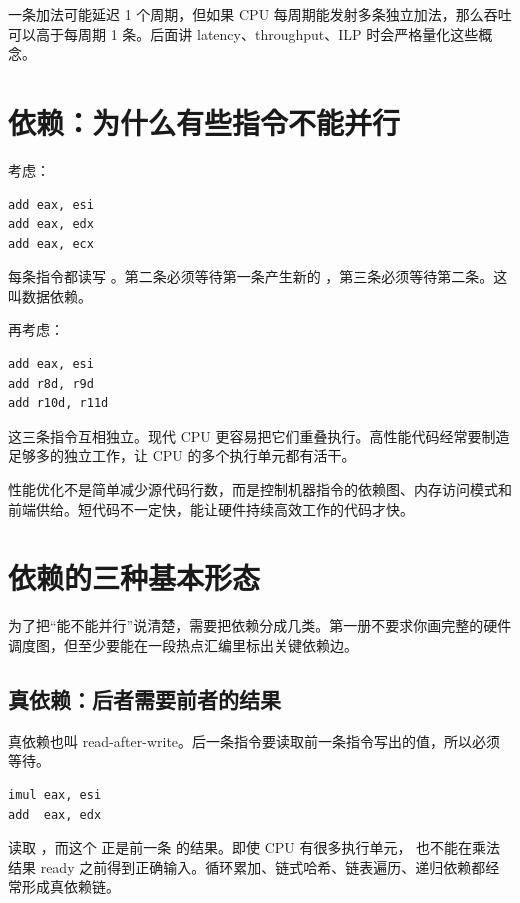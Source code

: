 一条加法可能延迟 1 个周期，但如果 CPU 每周期能发射多条独立加法，那么吞吐可以高于每周期 1 条。后面讲 latency、throughput、ILP 时会严格量化这些概念。

\section{依赖：为什么有些指令不能并行}

考虑：

\begin{lstlisting}
add eax, esi
add eax, edx
add eax, ecx
\end{lstlisting}

每条指令都读写 。第二条必须等待第一条产生新的 ，第三条必须等待第二条。这叫数据依赖。

再考虑：

\begin{lstlisting}
add eax, esi
add r8d, r9d
add r10d, r11d
\end{lstlisting}

这三条指令互相独立。现代 CPU 更容易把它们重叠执行。高性能代码经常要制造足够多的独立工作，让 CPU 的多个执行单元都有活干。

\begin{keyidea}
性能优化不是简单减少源代码行数，而是控制机器指令的依赖图、内存访问模式和前端供给。短代码不一定快，能让硬件持续高效工作的代码才快。
\end{keyidea}

\section{依赖的三种基本形态}

为了把“能不能并行”说清楚，需要把依赖分成几类。第一册不要求你画完整的硬件调度图，但至少要能在一段热点汇编里标出关键依赖边。

\subsection{真依赖：后者需要前者的结果}

真依赖也叫 read-after-write。后一条指令要读取前一条指令写出的值，所以必须等待。

\begin{lstlisting}
imul eax, esi
add  eax, edx
\end{lstlisting}

 读取 ，而这个  正是前一条  的结果。即使 CPU 有很多执行单元， 也不能在乘法结果 ready 之前得到正确输入。循环累加、链式哈希、链表遍历、递归依赖都经常形成真依赖链。

